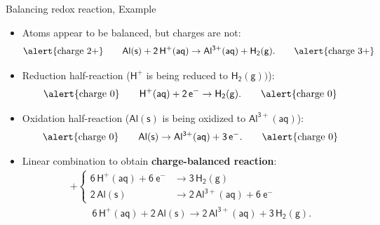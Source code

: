 %
%
%
%
%
\begin{frame}{Balancing redox reaction, Example}
	
	\begin{itemize}
		\item Atoms appear to be balanced, but \alert{charges are not}:\\[-5pt]
		\[
		\mbox{\alert{charge 2+}}
		\qquad
		\mathsf{Al(s)+2\, H^{+}(aq) \rightarrow Al^{3+}(aq)+H_2(g).}
		\qquad
		\mbox{\alert{charge 3+}}
		\]
		\item Reduction half-reaction ($\mathsf{H^{+}}$ is being reduced to $\mathsf{H_2(g))}$):\\[-5pt]
		\[
		\mbox{\alert{charge 0}}
		\qquad
		\mathsf{H^{+}(aq) +  2\, e^{-} \rightarrow H_2(g).}
		\qquad
		\mbox{\alert{charge 0}}
		\]
		\item Oxidation half-reaction ($\mathsf{Al(s)}$ is being oxidized to $\mathsf{Al^{3+}(aq)}$):\\[-5pt]
		\[
		\mbox{\alert{charge 0}}
		\qquad
		\mathsf{Al(s) \rightarrow Al^{3+}(aq) +  3\, e^{-} .}
		\qquad
		\mbox{\alert{charge 0}}
		\]
		\item Linear combination to obtain \alert{\bf charge-balanced reaction}: 
		$$
		\begin{array}{c}
			+\begin{cases}
				\mathsf{6\,H^{+}(aq)+6\:e^{-}} & \rightarrow\mathsf{3\,H_2(g)}\\
				\mathsf{2\,Al(s)} & \rightarrow\mathsf{2\,Al^{3+}(aq)+6\:e^{-}}
			\end{cases}\\[5pt]
			\hline \qquad\mathsf{\;6\,H^{+}(aq)+2\,Al(s)\rightarrow2\,Al^{3+}(aq)+}\mathsf{3\,H_2(g)}.
		\end{array}
	    $$
		\end{itemize}
	
\end{frame}
